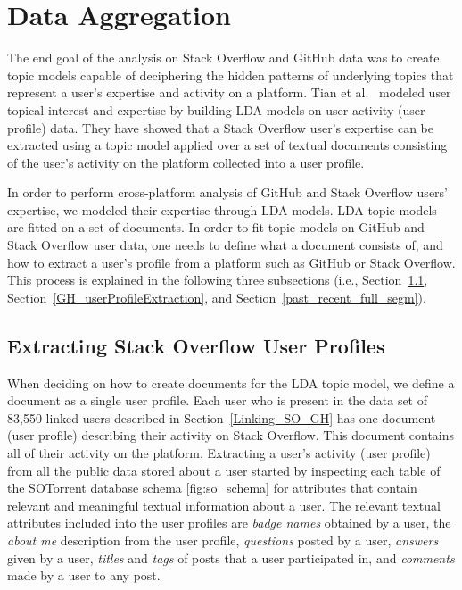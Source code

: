 \section{Data Aggregation} \label{sec:data_aggregation}

    The end goal of the analysis on Stack Overflow and GitHub data was to create topic models capable of deciphering the hidden patterns of underlying topics that represent a user's expertise and activity on a platform. Tian et al.~\cite{tian2013predicting} modeled user topical interest and expertise by building LDA models on user activity (user profile) data. They have showed that a Stack Overflow user's expertise can be extracted using a topic model applied over a set of textual documents consisting of the user's activity on the platform collected into a user profile.

    In order to perform cross-platform analysis of GitHub and Stack Overflow users' expertise, we modeled their expertise through LDA models. LDA topic models are fitted on a set of documents. In order to fit topic models on GitHub and Stack Overflow user data, one needs to define what a document consists of, and how to extract a user's profile from a platform such as GitHub or Stack Overflow. This process is explained in the following three subsections (i.e., Section~\ref{SO_userProfileExtraction}, Section~\ref{GH_userProfileExtraction}, and Section~\ref{past_recent_full_segm}).
    
    \subsection{Extracting Stack Overflow User Profiles} \label{SO_userProfileExtraction}
    
        When deciding on how to create documents for the LDA topic model, we define a document as a single user profile. Each user who is present in the data set of 83,550 linked users described in Section~\ref{Linking_SO_GH} has one document (user profile) describing their activity on Stack Overflow. This document contains all of their activity on the platform. Extracting a user's activity (user profile) from all the public data stored about a user started by inspecting each table of the SOTorrent database schema \ref{fig:so_schema} for attributes that contain relevant and meaningful textual information about a user. The relevant textual attributes included into the user profiles are \textit{badge names} obtained by a user, the \textit{about me} description from the user profile, \textit{questions} posted by a user, \textit{answers} given by a user, \textit{titles} and \textit{tags} of posts that a user participated in, and \textit{comments} made by a user to any post. 
          
